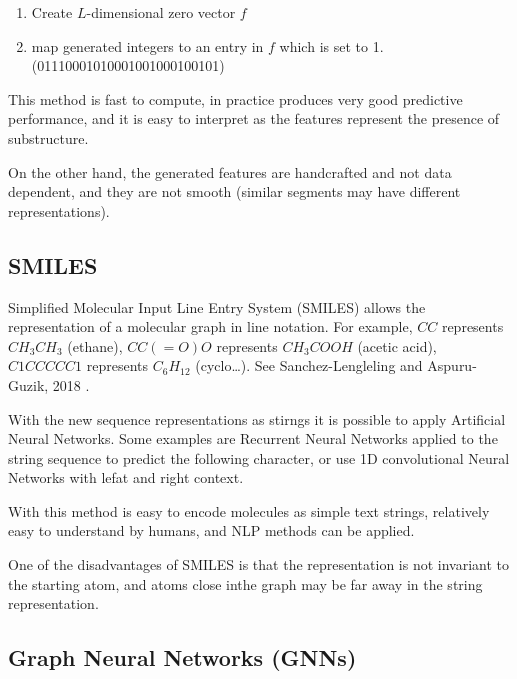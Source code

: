 \documentclass[b5paper]{report}
\begin{document}
\begin{enumerate}
\begin{enumerate}
\begin{figure}[h]
      \end{figure}
    \end{enumerate}
  \item Create $L$-dimensional zero vector $f$
  \item map generated integers to an entry in $f$ which is set to 1.
    (01110001010001001000100101)
\end{enumerate}


This method is fast to compute, in practice produces very good predictive
performance, and it is easy to interpret as the features represent the presence
of substructure.

On the other hand, the generated features are handcrafted and not data
dependent, and they are not smooth (similar segments may have different
representations).

\subsection{SMILES}

Simplified Molecular Input Line Entry System (SMILES) allows the representation
of a molecular graph in line notation. For example, $CC$ represents $CH_3CH_3$
(ethane), $CC(=O)O$ represents $CH_3COOH$ (acetic acid), $C1CCCCC1$ represents
$C_6H_{12}$ (cyclo\dots). See Sanchez-Lengleling and Aspuru-Guzik, 2018
\cite{gomez2018automatic}.

With the new sequence representations as stirngs it is possible to apply
Artificial Neural Networks. Some examples are Recurrent Neural Networks applied
to the string sequence to predict the following character, or use 1D
convolutional Neural Networks with lefat and right context.

With this method is easy to encode molecules as simple text strings, relatively
easy to understand by humans, and NLP methods can be applied.

One of the disadvantages of SMILES is that the representation is not invariant
to the starting atom, and atoms close inthe graph may be far away in the string
representation.

\subsection{Graph Neural Networks (GNNs)}
\end{document}
